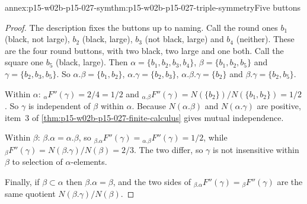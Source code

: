 \begin{annexitem}{annex:p15-w02b-p15-027-sym}{thm:p15-w02b-p15-027-triple-symmetry}{Five buttons}
\begin{proof}
The description fixes the buttons up to naming. Call the round ones
\(b_1\) (black, not large), \(b_2\) (black, large), \(b_3\) (not black,
large) and \(b_4\) (neither). These are the four round buttons, with two
black, two large and one both. Call the square one \(b_5\) (black,
large). Then
\(\alpha=\{b_1,b_2,b_3,b_4\}\), \(\beta=\{b_1,b_2,b_5\}\) and
\(\gamma=\{b_2,b_3,b_5\}\). So \(\alpha.\beta=\{b_1,b_2\}\),
\(\alpha.\gamma=\{b_2,b_3\}\), \(\alpha.\beta.\gamma=\{b_2\}\) and
\(\beta.\gamma=\{b_2,b_5\}\).

Within \(\alpha\):
\({}_{\alpha}F''(\gamma)=2/4=1/2\) and
\({}_{\alpha.\beta}F''(\gamma)=N(\{b_2\})/N(\{b_1,b_2\})=1/2\). So
\(\gamma\) is independent of \(\beta\) within \(\alpha\). Because
\(N(\alpha.\beta)\) and \(N(\alpha.\gamma)\) are positive, item~3 of
\cref{thm:p15-w02b-p15-027-finite-calculus} gives mutual independence.

Within \(\beta\): \(\beta.\alpha=\alpha.\beta\), so
\({}_{\beta.\alpha}F''(\gamma)={}_{\alpha.\beta}F''(\gamma)=1/2\), while
\({}_{\beta}F''(\gamma)=N(\beta.\gamma)/N(\beta)=2/3\). The two differ, so
\(\gamma\) is not insensitive within \(\beta\) to selection of
\(\alpha\)-elements.

Finally, if \(\beta\subset\alpha\) then \(\beta.\alpha=\beta\), and the two
sides of \({}_{\beta.\alpha}F''(\gamma)={}_{\beta}F''(\gamma)\) are the same
quotient \(N(\beta.\gamma)/N(\beta)\).
\end{proof}
\end{annexitem}


